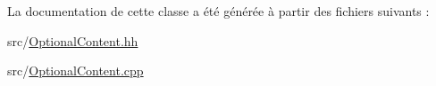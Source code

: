 La documentation de cette classe a été générée à partir des fichiers suivants :\begin{DoxyCompactItemize}
\item 
src/\hyperlink{_optional_content_8hh}{OptionalContent.hh}\item 
src/\hyperlink{_optional_content_8cpp}{OptionalContent.cpp}\end{DoxyCompactItemize}
